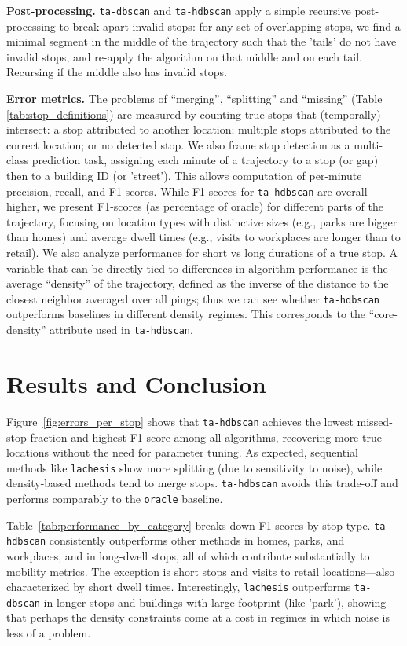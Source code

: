 \documentclass[9pt,twocolumn,twoside]{opticajnl}
\begin{document}
\noindent\textbf{Post-processing.} \texttt{ta-dbscan} and \texttt{ta-hdbscan} apply a simple recursive post-processing to break-apart invalid stops: for any set of overlapping stops, we find a minimal segment in the middle of the trajectory such that the 'tails' do not have invalid stops, and re-apply the algorithm on that middle and on each tail. Recursing if the middle also has invalid stops. 

\noindent\textbf{Error metrics.} The problems of ``merging'', ``splitting'' and ``missing'' (Table \ref{tab:stop_definitions}) are measured by counting true stops that (temporally) intersect: a stop attributed to another location; multiple stops attributed to the correct location; or no detected stop. We also frame stop detection as a multi-class prediction task, assigning each minute of a trajectory to a stop (or gap) then to a building ID (or 'street'). This allows computation of per-minute precision, recall, and F1-scores. While F1-scores for \texttt{ta-hdbscan} are overall higher, we present F1-scores (as percentage of oracle) for different parts of the trajectory, focusing on location types with distinctive sizes (e.g., parks are bigger than homes) and average dwell times (e.g., visits to workplaces are longer than to retail). We also analyze performance for short vs long durations of a true stop. A variable that can be directly tied to differences in algorithm performance is the average ``density'' of the trajectory, defined as the inverse of the distance to the closest neighbor averaged over all pings; thus we can see whether \texttt{ta-hdbscan} outperforms baselines in different density regimes. This corresponds to the ``core-density'' attribute used in \texttt{ta-hdbscan}.


\section{Results and Conclusion}

Figure~\ref{fig:errors_per_stop} shows that \texttt{ta-hdbscan} achieves the lowest missed-stop fraction and highest F1 score among all algorithms, recovering more true locations without the need for parameter tuning. As expected, sequential methods like \texttt{lachesis} show more splitting (due to sensitivity to noise), while density-based methods tend to merge stops. \texttt{ta-hdbscan} avoids this trade-off and performs comparably to the \texttt{oracle} baseline.

Table~\ref{tab:performance_by_category} breaks down F1 scores by stop type. \texttt{ta-hdbscan} consistently outperforms other methods in homes, parks, and workplaces, and in long-dwell stops, all of which contribute substantially to mobility metrics. The exception is short stops and visits to retail locations---also characterized by short dwell times. Interestingly, \texttt{lachesis} outperforms \texttt{ta-dbscan}  in longer stops and buildings with large footprint (like 'park'), showing that perhaps the density constraints come at a cost in regimes in which noise is less of a problem.
\end{document}
